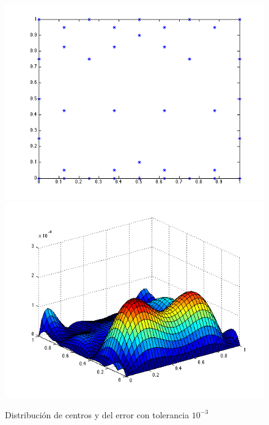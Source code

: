\documentclass[11pt,a4paper]{article}
\begin{document}
\begin{figure}[H]
\begin{center}
\includegraphics[scale=.4]{edp1_tol3.png}
\includegraphics[scale=.4]{error_edp1_tol3.png}
\caption{Distribución de centros y del error con tolerancia $10^{-3}$}
\end{center}
\end{figure}
\end{document}
